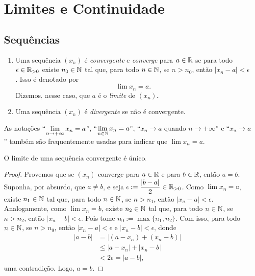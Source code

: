 
\chapter{Limites e Continuidade}

\section{Sequências}

\begin{definition}
    \leavevmode
        \begin{enumerate}[leftmargin=*, align=left, label=\textbf{(\alph*)}]
            \item Uma sequência $(x_n)$ é \emph{convergente} e \emph{converge} para $a \in \mathbb{R}$ se para todo $\epsilon \in \mathbb{R}_{>0}$ existe $n_0 \in \mathbb{N}$ tal que, para todo $n \in \mathbb{N}$, se $n > n_0$, então $|x_n - a| < \epsilon$. Isso é denotado por
                \[
                    \lim x_n =a.
                \]
            Dizemos, nesse caso, que $a$ é o \emph{limite} de $(x_n)$.
            \item Uma sequência $(x_n)$ é \emph{divergente} se não é convergente.
        \end{enumerate}
\end{definition}

\begin{remark}
    As notações ``$\displaystyle \lim_{n \to +\infty} x_n = a$'',  ``$\displaystyle \lim_{n \in \mathbb{N}} x_n = a$'', ``$x_n \to a$ quando $n \to +\infty$'' e ``$x_n \to a$'' também são frequentemente usadas para indicar que $\lim x_n =a$.
\end{remark}

\begin{proposition}[Unicidade]
    O limite de uma sequência convergente é único.
\end{proposition}

\begin{proof}
    Provemos que se $(x_n)$ converge para $a \in \mathbb{R}$ e para $b \in \mathbb{R}$, então $a=b$. Suponha, por absurdo, que $a \neq b$, e seja $\epsilon := \dfrac{|b-a|}{2} \in \mathbb{R}_{>0}$. Como $\lim x_n = a$, existe $n_1 \in \mathbb{N}$ tal que, para todo $n \in \mathbb{N}$, se $n > n_1$, então $|x_n-a| < \epsilon$. Analogamente, como $\lim x_n = b$, existe $n_2 \in \mathbb{N}$ tal que, para todo $n \in \mathbb{N}$, se $n > n_2$, então $|x_n-b| < \epsilon$. Pois tome $n_0 := \max\{n_1,n_2\}$. Com isso, para todo $n \in \mathbb{N}$, se $n > n_0$, então $|x_n-a| < \epsilon$ e $|x_n-b| < \epsilon$, donde
        \begin{align*}
            |a-b| &= |(a-x_n) + (x_n-b)| \\
            &\leq |a-x_n| + |x_n-b| \\
            &< 2\epsilon = |a-b|,
        \end{align*}
    uma contradição. Logo, $a=b$. \blackproof
\end{proof}

